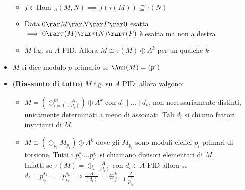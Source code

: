 \documentclass[a4paper,NoNotes,GeneralMath]{stdmdoc}
\newcommand{\Hom}{\text{Hom }}
\begin{document}
\begin{itemize}
			\begin{itemize}
				\item $f \in \Hom_A(M, N) \implies f(\tau(M)) \subseteq \tau(N)$
				\item Data $0 \rar M \rar N \rar P \rar 0$ esatta $\implies 0 \rar \tau(M) \rar \tau(N) \rar \tau(P)$ è esatta ma non a destra
				\item $M$ f.g. su $A$ PID. Allora $M \cong \tau(M) \oplus A^k$ per un qualche $k$
			\end{itemize}
		\item $M$ si dice modulo $p$-primario se $\Ann(M) = (p^s)$
		\item ({\bf Riassunto di tutto}) $M$ f.g. su $A$ PID. allora valgono:
			\begin{itemize}
				\item $M = (\oplus_{i=1}^m \frac{A}{(d_i)}) \oplus A^k$ con $d_1 \mid \ldots \mid d_m$ non necessariamente distinti, unicamente determinati a meno di associati. Tali $d_i$ si chiamo fattori invarianti di $M$.
				\item $M \cong (\oplus_{p_i} M_{p_i}) \oplus A^k$ dove gli $M_{p_i}$ sono moduli ciclici $p_i$-primari di torsione. Tutti i $p_1^{s_1} \ldots p_r^{s_r}$ si chiamano divisori elementari di $M$. \\
				Infatti se $\tau(M) = \oplus_i \frac{A}{(d_i)}$ con $d_i \in A$ PID allora se $d_i = p_{i_1}^{s_1} \cdot \ldots \cdot p_{i_k}^{s_k} \implies \frac{A}{(d_i)} = \oplus_{j=1}^k \frac{A}{p_{ij}^{s_j}}$
			\end{itemize}
	\end{itemize}
	
\end{document}
